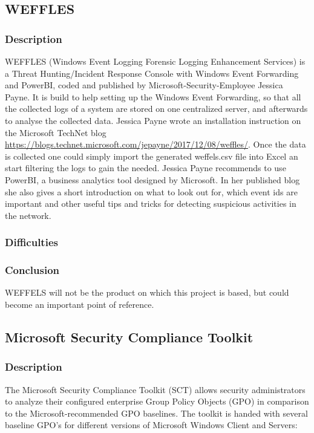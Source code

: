 \subsection{WEFFLES}
\subsubsection{Description}
WEFFLES (Windows Event Logging Forensic Logging Enhancement Services) is a Threat Hunting/Incident Response Console with Windows Event Forwarding and PowerBI, coded and published by Microsoft-Security-Employee Jessica Payne. It is build to help setting up the Windows Event Forwarding, so that all the collected logs of a system are stored on one centralized server, and afterwards to analyse the collected data. Jessica Payne wrote an installation instruction on the Microsoft TechNet blog \url{https://blogs.technet.microsoft.com/jepayne/2017/12/08/weffles/}. Once the data is collected one could simply import the generated weffels.csv file into Excel an start filtering the logs to gain the needed. Jessica Payne recommends to use PowerBI, a business analytics tool designed by Microsoft. In her published blog she also gives a short introduction on what to look out for, which event ids are important and other useful tips and tricks for detecting suspicious activities in the network.
\subsubsection{Difficulties}
\subsubsection{Conclusion}
WEFFELS will not be the product on which this project is based, but could become an important point of reference. 

\subsection{Microsoft Security Compliance Toolkit}
\subsubsection{Description}
The Microsoft Security Compliance Toolkit (SCT) \cite{SCT} allows security administrators to analyze their configured enterprise Group Policy Objects (GPO) in comparison to the Microsoft-recommended GPO baselines. The toolkit is handed with several baseline GPO's for different versions of Microsoft Windows Client and Servers:

